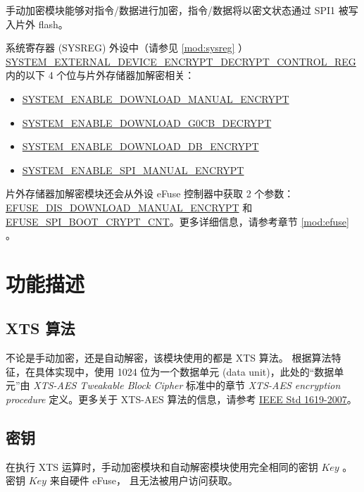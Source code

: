 \documentclass[main\_\_CN.tex]{subfiles}
\begin{document}
手动加密模块能够对指令/数据进行加密，指令/数据将以密文状态通过 SPI1 被写入片外 flash。

系统寄存器 (SYSREG) 外设中（请参见 \ref{mod:sysreg} \textit{}）\\ \hyperref[regdesc:SYSTEMEXTERNALDEVICEENCRYPTDECRYPTCONTROLREG]{SYSTEM\_EXTERNAL\_DEVICE\_ENCRYPT\_DECRYPT\_CONTROL\_REG} 内的以下 4 个位与片外存储器加解密相关：
\begin{itemize}
    \item \hyperref[fielddesc:SYSTEMENABLEDOWNLOADMANUALENCRYPT]{SYSTEM\_ENABLE\_DOWNLOAD\_MANUAL\_ENCRYPT} 
    \item \hyperref[fielddesc:SYSTEMENABLEDOWNLOADG0CBDECRYPT]{SYSTEM\_ENABLE\_DOWNLOAD\_G0CB\_DECRYPT} 
    \item \hyperref[fielddesc:SYSTEMENABLEDOWNLOADDBENCRYPT]{SYSTEM\_ENABLE\_DOWNLOAD\_DB\_ENCRYPT} 
    \item \hyperref[fielddesc:SYSTEMENABLESPIMANUALENCRYPT]{SYSTEM\_ENABLE\_SPI\_MANUAL\_ENCRYPT} 
\end{itemize}

片外存储器加解密模块还会从外设 eFuse 控制器中获取 2 个参数：\hyperref[fielddesc:EFUSEDISDOWNLOADMANUALENCRYPT]{EFUSE\_DIS\_DOWNLOAD\_MANUAL\_ENCRYPT} 和 \hyperref[fielddesc:EFUSESPIBOOTCRYPTCNT]{EFUSE\_SPI\_BOOT\_CRYPT\_CNT}。更多详细信息，请参考章节 \ref{mod:efuse} \textit{}。


\section{功能描述}

\subsection{XTS 算法} 
\label{sec:extmemncr-xts-algo}

不论是手动加密，还是自动解密，该模块使用的都是 XTS 算法。
根据算法特征，在具体实现中，使用 1024 位为一个数据单元 (data unit)，此处的“数据单元”由 \textit{XTS-AES Tweakable Block Cipher} 标准中的章节 \textit{XTS-AES encryption procedure} 定义。更多关于 XTS-AES 算法的信息，请参考 \href{https://ieeexplore.ieee.org/document/4493450}{IEEE Std 1619-2007}。

\subsection{密钥} 
\label{sec:extmemncr-key}

在执行 XTS 运算时，手动加密模块和自动解密模块使用完全相同的密钥 \begin{math}Key\end{math} 。密钥 \begin{math}Key\end{math}  来自硬件 eFuse， 且无法被用户访问获取。
\end{document}
